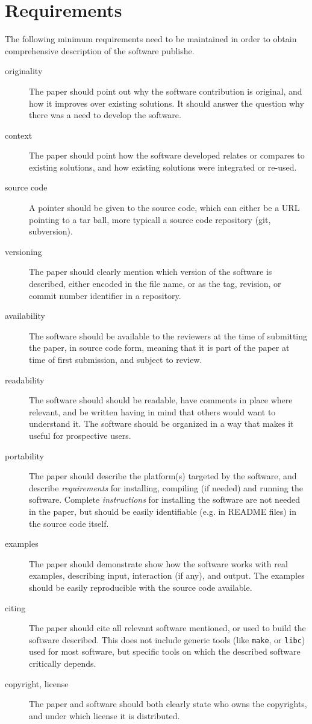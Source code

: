 \documentclass{article}
\begin{document}

\section{Requirements}
The following minimum requirements need to be maintained in order
to obtain comprehensive description of the software publishe.
\begin{description}
\item[originality] The paper should point out why the software
contribution is original, and how it improves over existing
solutions. It should answer the question why there was a 
need to develop the software.
\item[context] The paper should point how the software developed
relates or compares to existing solutions, and how existing solutions
were integrated or re-used.
\item[source code] A pointer should be given to the source code, 
which can either be a URL pointing to a tar ball, 
more typicall a source code repository (git, subversion). 
\item[versioning] The paper
should clearly mention which version of the software is described,
either encoded in the file name, or as the tag, revision, or commit
number identifier in a repository.
\item [availability] The software should be available to the 
reviewers at the time of submitting the paper, in source code form, 
meaning that it is part of the paper at time of first submission, 
and subject to review.
\item[readability] The software should should be readable, have comments
in place where relevant, and be written having in mind that others would
want to understand it. The software should be organized in a way that makes
it useful for prospective users.
\item [portability] The paper should describe the platform(s) targeted
by the software, and describe {\em requirements} for installing, compiling (if
needed) and running the software. Complete {\em instructions} for installing
the software are not needed in the paper, but should be easily identifiable
(e.g. in README files) in the source code itself.
\item[examples] The paper should demonstrate show how the software works
with real examples, describing input, interaction (if any), and output.
The examples should be easily reproducible with the source code available.
\item[citing] The paper should cite all relevant software mentioned, 
or used to build the software described. This does not include generic
tools (like {\tt make}, or {\tt libc}) used for most software, but specific
tools on which the described software critically depends.
\item[copyright, license] The paper and software should both
clearly state who owns the copyrights, and under which license
it is distributed.
\end{description}
\end{document}
